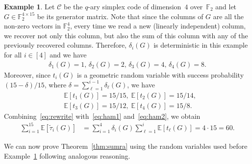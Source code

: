 \documentclass[11pt,a4paper,reqno,twoside]{amsart}
\theoremstyle{definition}
\newtheorem{example}{Example}
\newcommand{\F}{\mathbb{F}}
\newcommand{\E}{\mathbb{E}}
\newcommand{\mC}{\mathcal{C}}
\begin{document}
\begin{example} \label{ex:prof}
Let $\mC$ be the $q$-ary simplex code of dimension~$4$ over~$\F_2$ and let $G\in \F_2^{4 \times 15}$ be its generator matrix. 
Note that since the columns of $G$ are all the non-zero vectors in $\F_2^{4}$, every time we read a new (linearly independent) column, we recover not only this column, but also the sum of this column with any of the previously recovered columns. Therefore, $\delta_i(G)$ is deterministic in this example for all $i \in [4]$ and we have
\begin{align} \label{eq:ham1}
\delta_1(G) = 1, \, \delta_2(G) = 2,  \, \delta_3(G) = 4, \, \delta_4(G) = 8.
\end{align}
Moreover, since $t_i(G)$ is a geometric random variable with success probability ${\left(15-\delta\right)}/15$, where $\delta = \sum_{\ell=1}^{i-1} \delta_{\ell}(G) $, we have
\begin{align} \label{eq:ham2}
&\E[t_1(G)] = {15}/{15}, \; \E[t_2(G)] = {15}/{14}, \nonumber \\
&\E[t_3(G)] = {15}/{12}, \; \E[t_4(G)] = {15}/{8}.
\end{align}
Combining~\eqref{eq:rewrite} with~\eqref{eq:ham1} and~\eqref{eq:ham2}, we obtain
\begin{align*}
    \sum_{i=1}^{15} \E\left[ \widetilde{\tau}_i(G) \right] &= \sum_{i=1}^4\delta_i(G)\sum_{\ell=1}^i \E\left[t_\ell(G) \right]= 4\cdot 15 = 60.
\end{align*}
\end{example}

We can now prove Theorem~\ref{thm:sumra} using the random variables used before Example~\ref{ex:prof} following analogous reasoning.
\end{document}
